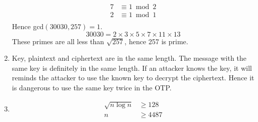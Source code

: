\documentclass[a4paper]{article}
\begin{document}
\begin{enumerate}
$$\begin{aligned}
		7 &\equiv 1 \bmod 2\\
		2 &\equiv 1 \bmod 1\\
	\end{aligned}
	$$
	Hence gcd$(30030, 257) = 1$.
	$$30030 = 2\times3\times5\times7\times11\times13$$
	These primes are all less than $\sqrt{257}$, hence 257 is prime.
	\item
	Key, plaintext and ciphertext are in the same length. The message with the same key is definitely in the same length. If an attacker knows the key, it will reminds the attacker to use the known key to decrypt the ciphertext. Hence it is dangerous to use the same key twice in the OTP.
	\item
	$$
	\begin{aligned}
		\sqrt{n\log n} &\geq 128\\
		n &\geq 4487
	\end{aligned}
	$$
	\end{enumerate}
\end{document}
